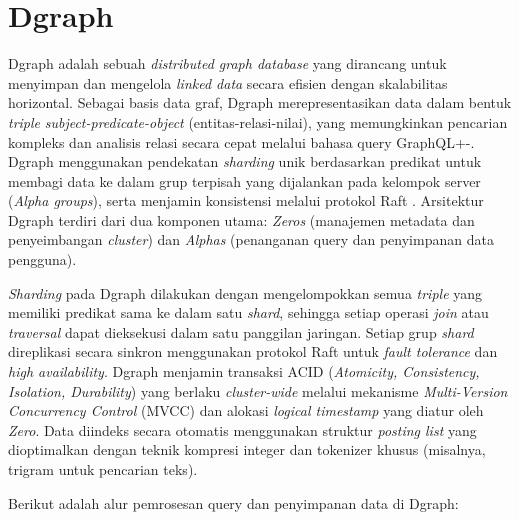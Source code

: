 \section{Dgraph}
\label{sec:dgraph}

Dgraph adalah sebuah \textit{distributed graph database} yang dirancang untuk menyimpan dan mengelola \textit{linked data} secara efisien dengan skalabilitas horizontal. Sebagai basis data graf, Dgraph merepresentasikan data dalam bentuk \textit{triple} \textit{subject-predicate-object} (entitas-relasi-nilai), yang memungkinkan pencarian kompleks dan analisis relasi secara cepat melalui bahasa query GraphQL+-. Dgraph menggunakan pendekatan \textit{sharding} unik berdasarkan predikat untuk membagi data ke dalam grup terpisah yang dijalankan pada kelompok server (\textit{Alpha groups}), serta menjamin konsistensi melalui protokol Raft \parencite{jain2005dgraph}. Arsitektur Dgraph terdiri dari dua komponen utama: \textit{Zeros} (manajemen metadata dan penyeimbangan \textit{cluster}) dan \textit{Alphas} (penanganan query dan penyimpanan data pengguna).

\textit{Sharding} pada Dgraph dilakukan dengan mengelompokkan semua \textit{triple} yang memiliki predikat sama ke dalam satu \textit{shard}, sehingga setiap operasi \textit{join} atau \textit{traversal} dapat dieksekusi dalam satu panggilan jaringan. Setiap grup \textit{shard} direplikasi secara sinkron menggunakan protokol Raft untuk \textit{fault tolerance} dan \textit{high availability}. Dgraph menjamin transaksi ACID (\textit{Atomicity, Consistency, Isolation, Durability}) yang berlaku \textit{cluster-wide} melalui mekanisme \textit{Multi-Version Concurrency Control} (MVCC) dan alokasi \textit{logical timestamp} yang diatur oleh \textit{Zero}. Data diindeks secara otomatis menggunakan struktur \textit{posting list} yang dioptimalkan dengan teknik kompresi integer dan tokenizer khusus (misalnya, trigram untuk pencarian teks).

Berikut adalah alur pemrosesan query dan penyimpanan data di Dgraph:

